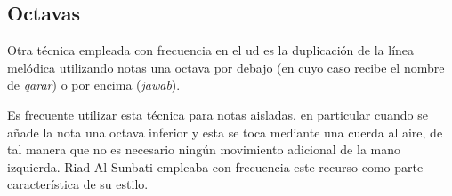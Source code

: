 \begin{center}
\end{center}



\subsection{Octavas}
\label{octavas}

Otra técnica empleada con frecuencia en el ud es la duplicación de la línea melódica utilizando notas una octava por debajo (en cuyo caso recibe el nombre de \emph{qarar}) o por encima (\emph{jawab}).

Es frecuente utilizar esta técnica para notas aisladas, en particular cuando se añade la nota una octava inferior y esta se toca mediante una cuerda al aire, de tal manera que no es necesario ningún movimiento adicional de la mano izquierda. Riad Al Sunbati empleaba con frecuencia este recurso como parte característica de su estilo.

\begin{center}
\end{center}



